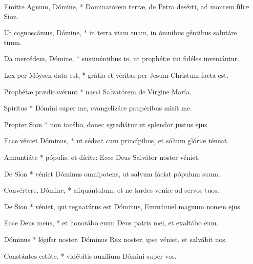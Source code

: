  Emítte Agnum, Dómine, * Dominatórem terræ, de Petra desérti, ad montem fíliæ Sion.

 Ut cognoscámus, Dómine, * in terra viam tuam, in ómnibus géntibus salutáre tuum.

 Da mercédem, Dómine, * sustinéntibus te, ut prophétæ tui fidéles inveniántur.

 Lex per Móysen data est, * grátia et véritas per Jesum Christum facta est.




 Prophétæ prædicavérunt * nasci Salvatórem de Vírgine María.


 Spíritus * Dómini super me, evangelizáre paupéribus misit me.

 Propter Sion * non tacébo, donec egrediátur ut splendor justus ejus.

 Ecce véniet Dóminus, * ut sédeat cum princípibus, et sólium glóriæ téneat.

 Annuntiáte * pópulis, et dícite: Ecce Deus Salvátor noster véniet.




 De Sion * véniet Dóminus omnípotens, ut salvum fáciat pópulum suum.


 Convértere, Dómine, * aliquántulum, et ne tardes veníre ad servos tuos.

 De Sion * véniet, qui regnatúrus est Dóminus, Emmánuel magnum nomen ejus.

 Ecce Deus meus, * et honorábo eum: Deus patris mei, et exaltábo eum.

 Dóminus * légifer noster, Dóminus Rex noster, ipse véniet, et salvábit nos.




 Constántes estóte, * vidébitis auxílium Dómini super vos.

